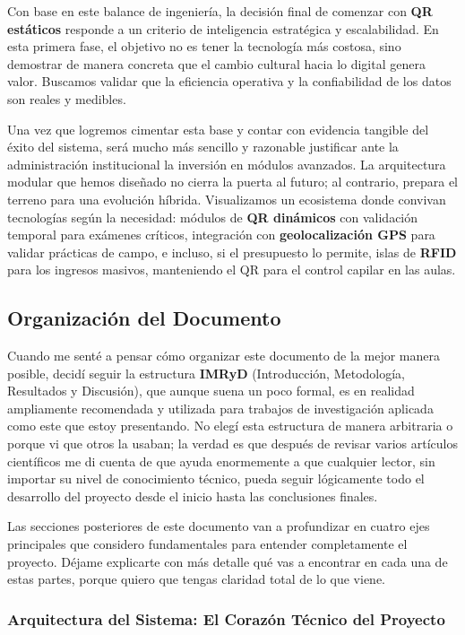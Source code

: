 Con base en este balance de ingeniería, la decisión final de comenzar con \textbf{QR estáticos} responde a un criterio de inteligencia estratégica y escalabilidad. En esta primera fase, el objetivo no es tener la tecnología más costosa, sino demostrar de manera concreta que el cambio cultural hacia lo digital genera valor. Buscamos validar que la eficiencia operativa y la confiabilidad de los datos son reales y medibles.

Una vez que logremos cimentar esta base y contar con evidencia tangible del éxito del sistema, será mucho más sencillo y razonable justificar ante la administración institucional la inversión en módulos avanzados. La arquitectura modular que hemos diseñado no cierra la puerta al futuro; al contrario, prepara el terreno para una evolución híbrida. Visualizamos un ecosistema donde convivan tecnologías según la necesidad: módulos de \textbf{QR dinámicos} con validación temporal para exámenes críticos, integración con \textbf{geolocalización GPS} para validar prácticas de campo, e incluso, si el presupuesto lo permite, islas de \textbf{RFID} para los ingresos masivos, manteniendo el QR para el control capilar en las aulas.

\subsection{Organización del Documento}

Cuando me senté a pensar cómo organizar este documento de la mejor manera posible, decidí seguir la estructura \textbf{IMRyD} (Introducción, Metodología, Resultados y Discusión), que aunque suena un poco formal, es en realidad ampliamente recomendada y utilizada para trabajos de investigación aplicada como este que estoy presentando. No elegí esta estructura de manera arbitraria o porque vi que otros la usaban; la verdad es que después de revisar varios artículos científicos me di cuenta de que ayuda enormemente a que cualquier lector, sin importar su nivel de conocimiento técnico, pueda seguir lógicamente todo el desarrollo del proyecto desde el inicio hasta las conclusiones finales.

Las secciones posteriores de este documento van a profundizar en cuatro ejes principales que considero fundamentales para entender completamente el proyecto. Déjame explicarte con más detalle qué vas a encontrar en cada una de estas partes, porque quiero que tengas claridad total de lo que viene.

\subsubsection*{Arquitectura del Sistema: El Corazón Técnico del Proyecto}

